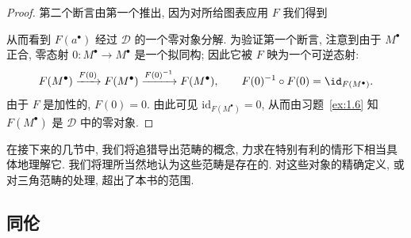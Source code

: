 \begin{proof}
第二个断言由第一个推出, 因为对所给图表应用 $F$ 我们得到
\begin{center}
\end{center}
从而看到 $F(a^\bullet)$ 经过 $\mathcal D$ 的一个零对象分解.
为验证第一个断言, 注意到由于 $M^\bullet$ 正合, 零态射 $0:M^\bullet\to M^\bullet$ 是一个拟同构; 因此它被 $F$ 映为一个可逆态射:
\[
F(M^\bullet)\xrightarrow{F(0)}F(M^\bullet)\xrightarrow{F(0)^{-1}}F(M^\bullet),
\qquad F(0)^{-1}\circ F(0)=\id_{F(M^\bullet)}.
\]
由于 $F$ 是加性的, $F(0)=0$. 由此可见 $\mathrm{id}_{F(M^\bullet)}=0$, 从而由习题~\ref{ex:1.6} 知 $F(M^\bullet)$ 是 $\mathcal D$ 中的零对象.
\end{proof}

\indent 在接下来的几节中, 我们将追猎导出范畴的概念, 力求在特别有利的情形下相当具体地理解它. 我们将理所当然地认为这些范畴是存在的. 对这些对象的精确定义, 或对三角范畴的处理, 超出了本书的范围.

\subsection{同伦}
\label{subsec:4.3-homotopy}

